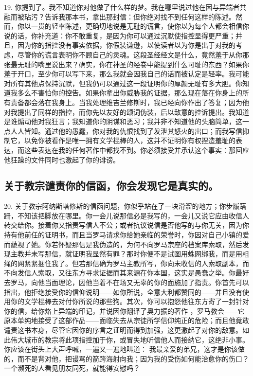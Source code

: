 19. 你提到了。我不知道你对他做了什么样的梦。我在哪里说过他在因与异端者共融而被玷污？告诉我那本书，拿出那封信：但你绝对找不到任何这样的陈述。然而，你以一贯的轻率陈述，更确切地说是无耻的谎言，使你以为每个人都会相信你说的话，你补充道：你不敢重复，是因为你可以通过沉默使指控显得更严重；并且，因为你的指控没有事实依据，你假装谦逊，以使读者以为你是出于对我的考虑，尽管你的谎言表明你不顾自己的灵魂。这段圣经经文是什么，竟然羞于从你那张最无耻的嘴里说出来？确实，你在神圣的经卷中能提到什么可耻的东西？如果你羞于开口，至少你可以写下来，那么我就会因我自己的话而被认定是轻率。我可能对所有其他点保持沉默，但我仍可以通过这一段证明你的厚颜无耻有多大胆。你知道我多么不害怕你的控告。如果你拿出你威胁我的证据，那么现在落在你身上的所有责备都会落在我身上。当我处理维吉兰修斯时，我已经向你作出了答复；因为他对我提出了同样的指控，而你先以友好的颂词伪装，后以敌意的控诉提出。我知道是谁煽动他对我狂言；我知道你的阴谋和恶习；我并非不知道他的头脑简单，这一点人人皆知。通过他的愚蠢，你对我的仇恨找到了发泄其怒火的出口；而我写信抑制它，以免你被看作是唯一拥有文学棍棒的人，这并不证明你有权捏造羞耻的表达，而这些表达在我的任何著作中都找不到。你必须接受并承认这个事实：那回应他狂躁的文件同时也激起了你的诽谤。\par


\subsection{关于教宗谴责你的信函，你会发现它是真实的。}

20. 关于教宗阿纳斯塔修斯的信函问题，你似乎站在了一块滑溜的地方；你步履蹒跚，不知该把脚放在哪里。你一会儿说那信必是我写的，一会儿又说它应由收信人转交给你。接着你又指责写信人不公；或者抗议说信是否他写的与你无关，因为你持有他前任的证明书，而且当罗马请求你给她亲临的荣誉时，你因对自己小镇的爱而藐视了她。你若怀疑那信是我伪造的，为何不向罗马宗座的档案库索取，然后发现主教并未写那信，就证明我显然有罪？那时你便不是试图用蛛网绑我，而是用粗绳的网紧紧捆住我了。但若那信确为罗马主教所写，你向未收信的人索取副本，而不向发信人索取，又往东方寻求证据而其来源在你本国，这实是愚蠢之举。你最好去罗马，向他当面理论，因他当着不在场又无辜的你的面施加了指责。你首先可以指出，他拒绝接受你的信仰说明——如你所说，全意大利都赞同的——并且没有使用你的文学棍棒去对付你所说的那些狗。其次，你可以抱怨他往东方寄了一封针对你的信，给你烙上异端的印记，并说因你翻译了奥力振的著作 ，罗马教会——它原本单纯地接受了这部作品——面临失去从宗徒所学信仰纯正的危险；而且他竟敢谴责这书本身，尽管它因你的序言之证明而得到加强，这更激起了对你的敌意。如此伟大城市的教宗将此项指控加于你，或冒失地听信他人而接纳它，这绝非小事。你应该在街头上大声呼喊，一遍又一遍地叫道： 我最亲爱的弟兄，这才是你该做的，而不是背对他，把谩骂的箭跨海射向我；因为我的受伤如何能治愈你的伤口？一个濒死的人看见朋友同死，就能得安慰吗？\par

